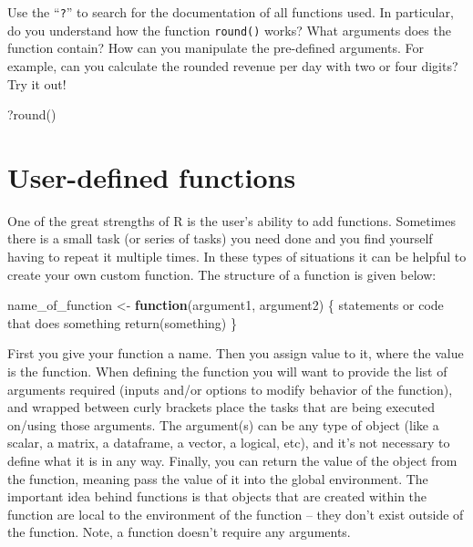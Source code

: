 \documentclass[
  12pt,
  oneside]{book}
\newenvironment{Shaded}{\begin{snugshade}}{\end{snugshade}}
\newcommand{\ControlFlowTok}[1]{\textcolor[rgb]{0.13,0.29,0.53}{\textbf{#1}}}
\newcommand{\FunctionTok}[1]{\textcolor[rgb]{0.00,0.00,0.00}{#1}}
\newcommand{\NormalTok}[1]{#1}
\newcommand{\OtherTok}[1]{\textcolor[rgb]{0.56,0.35,0.01}{#1}}
\theoremstyle{definition}
\theoremstyle{definition}
\theoremstyle{definition}
\theoremstyle{definition}
\theoremstyle{remark}
\begin{document}
Use the ``\texttt{?}'' to search for the documentation of all functions used. In particular, do you understand how the function \texttt{round()} works? What arguments does the function contain? How can you manipulate the pre-defined arguments. For example, can you calculate the rounded revenue per day with two or four digits? Try it out!

\begin{Shaded}
\begin{Highlighting}[]
\NormalTok{?}\FunctionTok{round}\NormalTok{()}
\end{Highlighting}
\end{Shaded}

\hypertarget{sec:generics}{%
\section{User-defined functions}\label{sec:generics}}

One of the great strengths of R is the user's ability to add functions. Sometimes there is a small task (or series of tasks) you need done and you find yourself having to repeat it multiple times. In these types of situations it can be helpful to create your own custom function. The structure of a function is given below:

\begin{Shaded}
\begin{Highlighting}[]
\NormalTok{name\_of\_function }\OtherTok{\textless{}{-}} \ControlFlowTok{function}\NormalTok{(argument1, argument2) \{}
\NormalTok{    statements or code that does something}
    \FunctionTok{return}\NormalTok{(something)}
\NormalTok{\}}
\end{Highlighting}
\end{Shaded}

First you give your function a name.
Then you assign value to it, where the value is the function.
When defining the function you will want to provide the list of arguments required (inputs and/or options to modify behavior of the function), and wrapped between curly brackets place the tasks that are being executed on/using those arguments. The argument(s) can be any type of object (like a scalar, a matrix, a dataframe, a vector, a logical, etc), and it's not necessary to define what it is in any way.
Finally, you can return the value of the object from the function, meaning pass the value of it into the global environment. The important idea behind functions is that objects that are created within the function are local to the environment of the function -- they don't exist outside of the function. Note, a function doesn't require any arguments.
\end{document}
